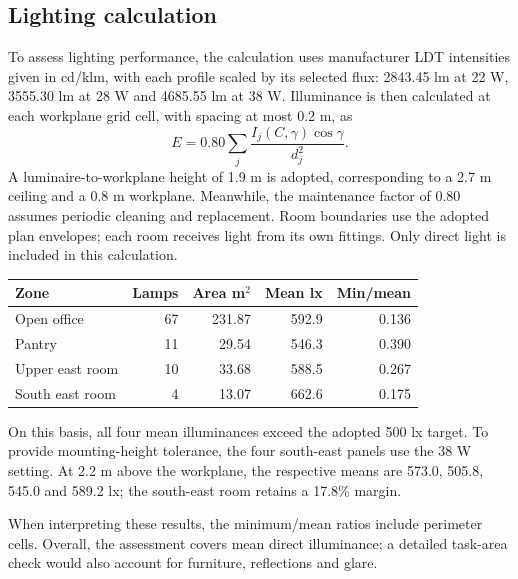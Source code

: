 \subsection*{Lighting calculation}
To assess lighting performance, the calculation uses manufacturer LDT intensities given in cd/klm, with each profile scaled by its selected flux: 2843.45 lm at 22 W, 3555.30 lm at 28 W and 4685.55 lm at 38 W. Illuminance is then calculated at each workplane grid cell, with spacing at most 0.2 m, as
\[
E=0.80\sum_j\frac{I_j(C,\gamma)\cos\gamma}{d_j^2}.
\]
A luminaire-to-workplane height of 1.9 m is adopted, corresponding to a 2.7 m ceiling and a 0.8 m workplane. Meanwhile, the maintenance factor of 0.80 assumes periodic cleaning and replacement. Room boundaries use the adopted plan envelopes; each room receives light from its own fittings. Only direct light is included in this calculation.
\begin{center}\begin{tabular}{lrrrr}\toprule
Zone & Lamps & Area m$^2$ & Mean lx & Min/mean\\\midrule
Open office & 67 & 231.87 & 592.9 & 0.136\\
Pantry & 11 & 29.54 & 546.3 & 0.390\\
Upper east room & 10 & 33.68 & 588.5 & 0.267\\
South east room & 4 & 13.07 & 662.6 & 0.175\\
\bottomrule\end{tabular}\end{center}
On this basis, all four mean illuminances exceed the adopted 500 lx target. To provide mounting-height tolerance, the four south-east panels use the 38 W setting. At 2.2 m above the workplane, the respective means are 573.0, 505.8, 545.0 and 589.2 lx; the south-east room retains a 17.8\% margin.

When interpreting these results, the minimum/mean ratios include perimeter cells. Overall, the assessment covers mean direct illuminance; a detailed task-area check would also account for furniture, reflections and glare.
